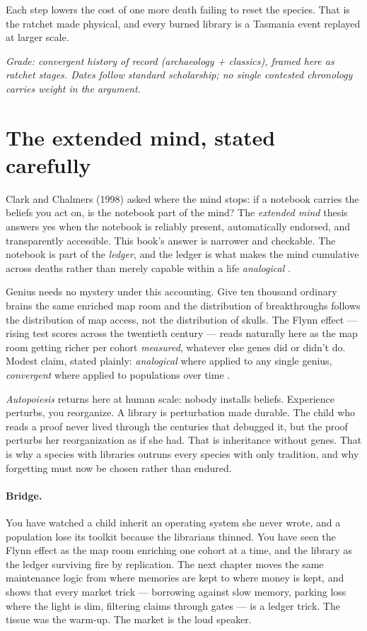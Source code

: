 Each step lowers the cost of one more death failing to reset the species. That is the ratchet made physical, and every burned library is a Tasmania event replayed at larger scale.

\textit{Grade: convergent history of record (archaeology + classics), framed here as ratchet stages. Dates follow standard scholarship; no single contested chronology carries weight in the argument.}

\section{The extended mind, stated carefully}

Clark and Chalmers (1998) asked where the mind stops: if a notebook carries the beliefs you act on, is the notebook part of the mind? The \textit{extended mind} thesis answers yes when the notebook is reliably present, automatically endorsed, and transparently accessible. This book's answer is narrower and checkable. The notebook is part of the \textit{ledger}, and the ledger is what makes the mind cumulative across deaths rather than merely capable within a life \textit{analogical} \citep{clark2016}.

Genius needs no mystery under this accounting. Give ten thousand ordinary brains the same enriched map room and the distribution of breakthroughs follows the distribution of map access, not the distribution of skulls. The Flynn effect --- rising test scores across the twentieth century --- reads naturally here as the map room getting richer per cohort \textit{measured}, whatever else genes did or didn't do. Modest claim, stated plainly: \textit{analogical} where applied to any single genius, \textit{convergent} where applied to populations over time \citep{henrich,tomasello}.

\textit{Autopoiesis} \citep{maturana1980} returns here at human scale: nobody installs beliefs. Experience perturbs, you reorganize. A library is perturbation made durable. The child who reads a proof never lived through the centuries that debugged it, but the proof perturbs her reorganization as if she had. That is inheritance without genes. That is why a species with libraries outruns every species with only tradition, and why forgetting must now be chosen rather than endured.

\paragraph{Bridge.} You have watched a child inherit an operating system she never wrote, and a population lose its toolkit because the librarians thinned. You have seen the Flynn effect as the map room enriching one cohort at a time, and the library as the ledger surviving fire by replication. The next chapter moves the same maintenance logic from where memories are kept to where money is kept, and shows that every market trick --- borrowing against slow memory, parking loss where the light is dim, filtering claims through gates --- is a ledger trick. The tissue was the warm-up. The market is the loud speaker.
